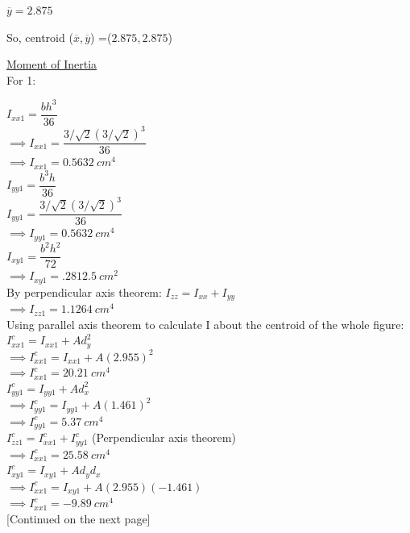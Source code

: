 \documentclass{article}
\begin{document}
\noindent $\overline{y} =2.875$

\noindent So, centroid ($\overline{x},\overline{y} $) =($2.875,2.875 $)

\noindent \underline{Moment of Inertia}\\

\noindent For 1: 

\noindent $I_{xx1}=\dfrac{bh^3}{36}$\\
$\implies I_{xx1}=\dfrac{3/\sqrt{2}(3/\sqrt{2})^3}{36}$\\
$\implies I_{xx1}=0.5632 \ cm^4$\\

\noindent $I_{yy1}=\dfrac{b^3h}{36}$\\
$I_{yy1}=\dfrac{3/\sqrt{2}(3/\sqrt{2})^3}{36}$\\
$\implies I_{yy1}=0.5632 \ cm^4$\\

\noindent $I_{xy1}= \dfrac{b^2h^2}{72}$\\
$\implies I_{xy1}= .2812.5 \ cm^2$\\

\noindent By perpendicular axis theorem: $I_{zz}= I_{xx}+I_{yy}$\\
$\implies I_{zz1}=1.1264\ cm^4$\\

\noindent Using parallel axis theorem to calculate I about the centroid of the whole figure:\\

\noindent $I_{xx1}^c=I_{xx1}+Ad_y^2$\\
$\implies I_{xx1}^c= I_{xx1}+A(2.955)^2$\\
$\implies I_{xx1}^c= 20.21\ cm^4$\\

\noindent $I_{yy1}^c=I_{yy1}+Ad_x^2$\\
$\implies I_{yy1}^c= I_{yy1}+A(1.461)^2$\\
$\implies I_{yy1}^c= 5.37\ cm^4$\\

\noindent $I_{zz1}^c=I_{xx1}^c+I_{yy1}^c$ (Perpendicular axis theorem)\\
$\implies I_{xx1}^c= 25.58\ cm^4$\\

\noindent $I_{xy1}^c=I_{xy1}+Ad_yd_x$\\
$\implies I_{xx1}^c= I_{xy1}+A(2.955)(-1.461)$\\
$\implies I_{xx1}^c= -9.89 \ cm^4$\\

[Continued on the next page]
\end{document}
